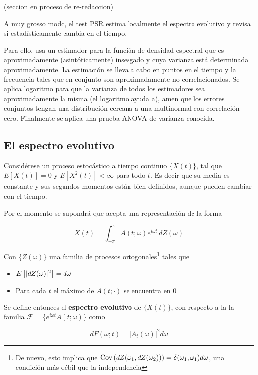 (seccion en proceso de re-redaccion)

A muy grosso modo, el test PSR estima localmente  el espectro evolutivo
 y revisa si estad\'isticamente
cambia en el tiempo.

Para ello, usa un estimador para la funci\'on de densidad espectral
que es aproximadamente (asint\'oticamente) insesgado y cuya varianza est\'a
determinada aproximadamente. La estimaci\'on se lleva a cabo en puntos en el tiempo y
la frecuencia tales que en conjunto son aproximadamente no-correlacionados.
Se aplica logaritmo para que la varianza de todos los estimadores sea aproximadamente
la misma (el logaritmo ayuda a), amen que los errores conjuntos tengan una
distribuci\'on cercana a una multinormal con correlaci\'on cero.
Finalmente se aplica una prueba ANOVA de varianza conocida.

\subsection{El espectro evolutivo}

Consid\'erese un proceso estoc\'astico a tiempo continuo $\{X(t)\}$, tal que
$E[X(t)]=0$ y $E\left[ X^{2}(t)\right] < \infty$ para todo $t$. Es decir que su media es constante
y sus segundos momentos est\'an bien definidos, aunque pueden cambiar con el tiempo.

Por el momento se supondr\'a que acepta una representaci\'on de la forma

\begin{equation*}
X(t) = \int_{-\pi}^{\pi} A(t ; \omega) e^{i\omega t} \, d Z(\omega)
\end{equation*}

Con $\{ Z(\omega) \}$ una familia de procesos ortogonales\footnote{De nuevo, esto implica que
$\mathrm{Cov}\left( dZ(\omega_1,dZ(\omega_2)) \right) = \delta(\omega_1,\omega_1) d\omega$, una condici\'on m\'as
d\'ebil que la independencia} tales que

\begin{itemize}
\item $E \left[\lvert  dZ(\omega) \rvert^{2} \right] = d\omega$
\item Para cada $t$ el m\'aximo de $A(t;\cdot)$ se encuentra en 0
\end{itemize}

Se define entonces el \textbf{espectro evolutivo} de $\{X(t)\}$, con respecto a la la familia
$\mathcal{F} = \{ e^{i\omega t} A(t; \omega) \}$
 como
 
\begin{equation*}
d F(\omega;t) = \lvert A_t(\omega) \lvert^{2} d\omega
\end{equation*}

